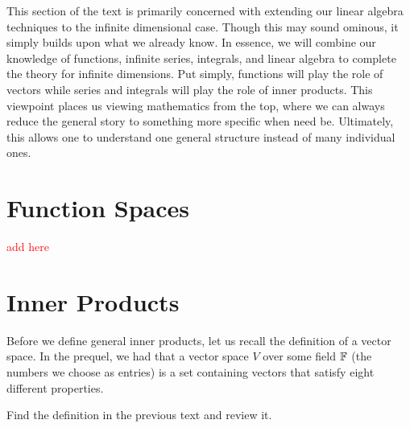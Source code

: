 This section of the text is primarily concerned with extending our linear algebra techniques to the infinite dimensional case.  Though this may sound ominous, it simply builds upon what we already know.  In essence, we will combine our knowledge of functions, infinite series, integrals, and linear algebra to complete the theory for infinite dimensions.  Put simply, functions will play the role of vectors while series and integrals will play the role of inner products.  This viewpoint places us viewing mathematics from the top, where we can always reduce the general story to something more specific when need be. Ultimately, this allows one to understand one general structure instead of many individual ones.

\section{Function Spaces}

\textcolor{red}{add here}

\section{Inner Products}

Before we define general inner products, let us recall the definition of a vector space.  In the prequel, we had that a vector space $V$ over some field $\mathbb{F}$ (the numbers we choose as entries) is a set containing vectors that satisfy eight different properties.

\begin{exercise}
	Find the definition in the previous text and review it.
\end{exercise}

